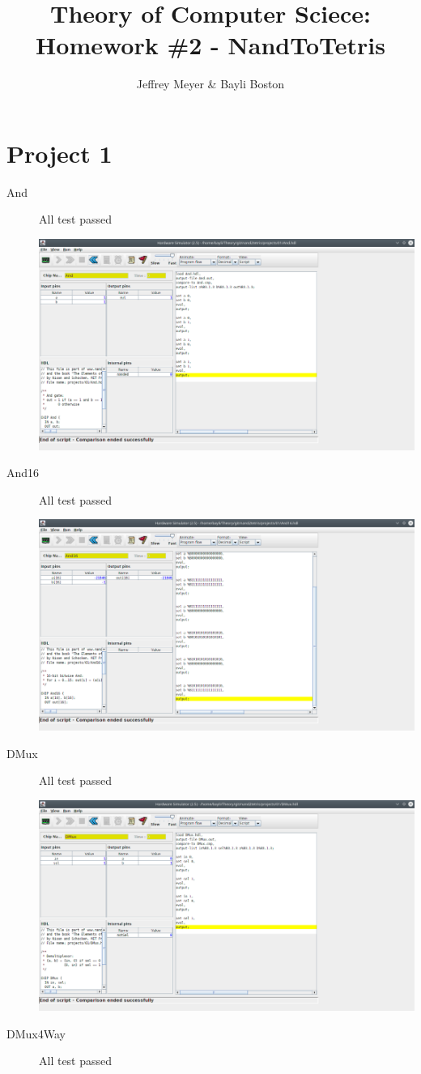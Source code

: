 \documentclass[titlepage]{article}
\author{Jeffrey Meyer & Bayli Boston}
\title{Theory of Computer Sciece: Homework \#2 - NandToTetris}
\begin{document}
\maketitle

\newpage

\section{Project 1}

\begin{description}
  \item[And]{
    All test passed

    \includegraphics[width=.9\textwidth]{01/And.png}
  }
  \item[And16]{
    All test passed

    \includegraphics[width=.9\textwidth]{01/And16.png}
  }
  \item[DMux]{
    All test passed

    \includegraphics[width=.9\textwidth]{01/DMux.png}
  }
  \item[DMux4Way]{
    All test passed

}
\end{description}
\end{document}
